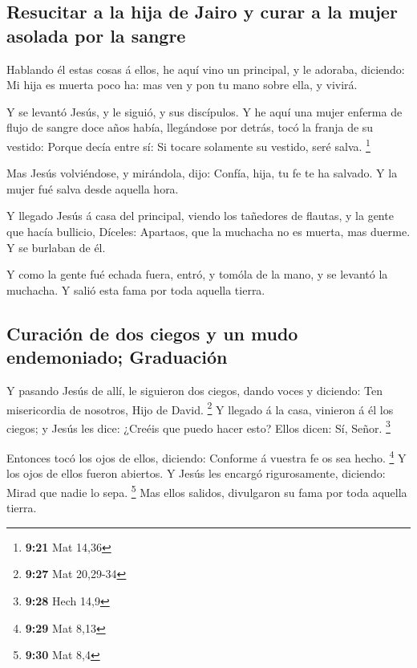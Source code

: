 \hypertarget{resucitar-a-la-hija-de-jairo-y-curar-a-la-mujer-asolada-por-la-sangre}{%
\subsection{Resucitar a la hija de Jairo y curar a la mujer asolada por
la
sangre}\label{resucitar-a-la-hija-de-jairo-y-curar-a-la-mujer-asolada-por-la-sangre}}

 Hablando él estas cosas á ellos, he aquí vino un
principal, y le adoraba, diciendo: Mi hija es muerta poco ha: mas ven y
pon tu mano sobre ella, y vivirá.

 Y se levantó Jesús, y le siguió, y sus discípulos.
 Y he aquí una mujer enferma de flujo de sangre doce años
había, llegándose por detrás, tocó la franja de su vestido:
 Porque decía entre sí: Si tocare solamente su vestido,
seré salva. \footnote{\textbf{9:21} Mat 14,36}

 Mas Jesús volviéndose, y mirándola, dijo: Confía, hija,
tu fe te ha salvado. Y la mujer fué salva desde aquella hora.

 Y llegado Jesús á casa del principal, viendo los
tañedores de flautas, y la gente que hacía bullicio, 
Díceles: Apartaos, que la muchacha no es muerta, mas duerme. Y se
burlaban de él.

 Y como la gente fué echada fuera, entró, y tomóla de la
mano, y se levantó la muchacha.  Y salió esta fama por
toda aquella tierra.

\hypertarget{curaciuxf3n-de-dos-ciegos-y-un-mudo-endemoniado-graduaciuxf3n}{%
\subsection{Curación de dos ciegos y un mudo endemoniado;
Graduación}\label{curaciuxf3n-de-dos-ciegos-y-un-mudo-endemoniado-graduaciuxf3n}}

 Y pasando Jesús de allí, le siguieron dos ciegos, dando
voces y diciendo: Ten misericordia de nosotros, Hijo de David.
\footnote{\textbf{9:27} Mat 20,29-34}  Y llegado á la
casa, vinieron á él los ciegos; y Jesús les dice: ¿Creéis que puedo
hacer esto? Ellos dicen: Sí, Señor. \footnote{\textbf{9:28} Hech 14,9}

 Entonces tocó los ojos de ellos, diciendo: Conforme á
vuestra fe os sea hecho. \footnote{\textbf{9:29} Mat 8,13}
 Y los ojos de ellos fueron abiertos. Y Jesús les encargó
rigurosamente, diciendo: Mirad que nadie lo sepa. \footnote{\textbf{9:30}
  Mat 8,4}  Mas ellos salidos, divulgaron su fama por
toda aquella tierra.

